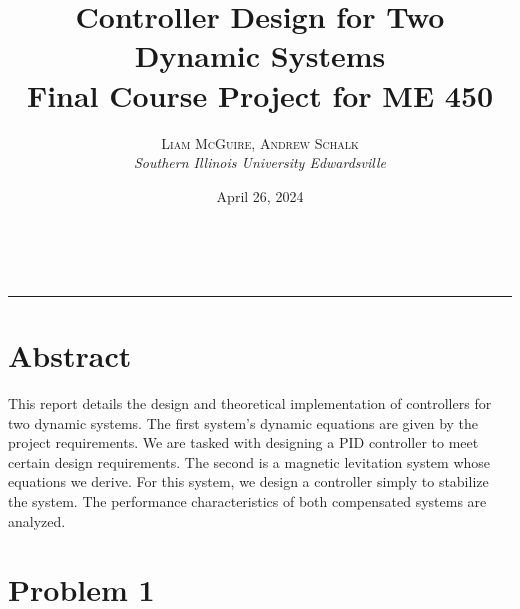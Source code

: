 \documentclass{article}
\title{\textbf{Controller Design for Two Dynamic Systems}\\ %
\vspace{2pt}
Final Course Project for ME 450} %
\author{\textsc{Liam McGuire, Andrew Schalk} %
\bigskip
\\{\textit{Southern Illinois University Edwardsville}}} %
\date{April 26, 2024} %
\makeatletter
\renewcommand{\maketitle}{ %
\begin{flushright} %
{\LARGE\@title} %

\vspace{50pt} %

{\large\@author} %
\\\@date %

\vspace{40pt} %
\end{flushright}
}
\makeatother
\begin{document}
    \thispagestyle{empty}
    \maketitle %
    \vspace{300pt} %
    \begin{center}
        \rule{15cm}{.35pt}
    \end{center}
    \section*{Abstract}
    This report details the design and theoretical implementation of controllers for two dynamic systems. 
    The first system's dynamic equations are given by the project requirements.
    We are tasked with designing a PID controller to meet certain design requirements. 
    The second is a magnetic levitation system whose equations we derive. 
    For this system, we design a controller simply to stabilize the system.
    The performance characteristics of both compensated systems are analyzed.
    \newpage
    \tableofcontents
    \newpage
    \section{Problem 1}
\end{document}
